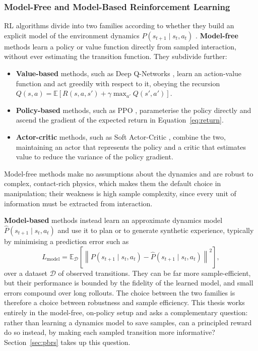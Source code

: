 \subsubsection{Model-Free and Model-Based Reinforcement Learning}

RL algorithms divide into two families according to whether they build an
explicit model of the environment dynamics $P(s_{t+1} \mid s_t, a_t)$
\cite{Yang2023SimtoRealMA}. \textbf{Model-free} methods learn a policy or value
function directly from sampled interaction, without ever estimating the
transition function. They subdivide further:
\begin{itemize}
  \item \textbf{Value-based} methods, such as Deep Q-Networks \cite{DQN}, learn
        an action-value function and act greedily with respect to it, obeying the
        recursion $Q(s, a) = \mathbb{E}[R(s, a, s') + \gamma \max_{a'} Q(s',
        a')]$.
  \item \textbf{Policy-based} methods, such as PPO
        \cite{Schulman2017ProximalPO}, parameterise the policy directly and
        ascend the gradient of the expected return in Equation~\ref{eq:return}.
  \item \textbf{Actor-critic} methods, such as Soft Actor-Critic
        \cite{Haarnoja2018SoftAO}, combine the two, maintaining an actor that
        represents the policy and a critic that estimates value to reduce the
        variance of the policy gradient.
\end{itemize}
Model-free methods make no assumptions about the dynamics and are robust to
complex, contact-rich physics, which makes them the default choice in
manipulation; their weakness is high sample complexity, since every unit of
information must be extracted from interaction.

\textbf{Model-based} methods instead learn an approximate dynamics model
$\hat{P}(s_{t+1} \mid s_t, a_t)$ and use it to plan or to generate synthetic
experience, typically by minimising a prediction error such as
\begin{equation}
    L_{\text{model}} = \mathbb{E}_{\mathcal{D}}\!\left[ \left\lVert P(s_{t+1} \mid s_t, a_t) - \hat{P}(s_{t+1} \mid s_t, a_t) \right\rVert^2 \right],
\end{equation}
over a dataset $\mathcal{D}$ of observed transitions. They can be far more
sample-efficient, but their performance is bounded by the fidelity of the learned
model, and small errors compound over long rollouts. The choice between the two
families is therefore a choice between robustness and sample efficiency. This
thesis works entirely in the model-free, on-policy setup and asks a
complementary question: rather than learning a dynamics model to save samples,
can a principled reward do so instead, by making each sampled transition more
informative? Section~\ref{sec:pbrs} takes up this question.

